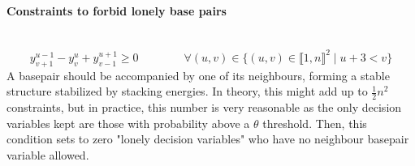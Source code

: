 \documentclass{article}
\begin{document}
\paragraph{Constraints to forbid lonely base pairs} ~
\begin{equation} \label{constraint:2}
	y^{u-1}_{v+1} - y^u_v + y^{u+1}_{v-1} \geq 0 \qquad \qquad \forall (u,v) \in \{ (u,v) \in \llbracket 1,n\rrbracket^2 \; | \; u + 3 <v \}
\end{equation}
A basepair should be accompanied by one of its neighbours, forming a stable structure stabilized by stacking energies. In theory, this might add up to \( \frac{1}{2}n^2\) constraints, but in practice, this number is very reasonable as
the only decision variables kept are those with probability above a $\theta$ threshold. 
Then, this condition sets to zero "lonely decision variables" who have no neighbour basepair variable allowed.


\end{document}
